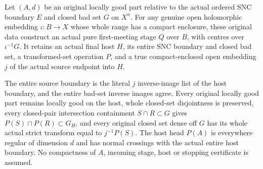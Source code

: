 \begin{theorem}
\label{hir:original-local-pure-head-actual-host-producer}
Let $(A,d)$ be an original locally good part relative to the actual
ordered SNC boundary $E$ and closed bad set $G$ on $X^n$. For any
genuine open holomorphic embedding $\iota:B\to X$ whose whole range
has a compact enclosure, these original data construct an actual pure
first-meeting stage $Q$ over $B$, with centres over $\iota^{-1}G$.
It retains an actual final host $H$, its entire SNC boundary and closed
bad set, a transformed-set operation $P$, and a true compact-enclosed
open embedding $j$ of the actual source endpoint into $H$.

The entire source boundary is the literal $j$ inverse-image list of
the host boundary, and the entire bad-set inverse images agree. Every
original locally good part remains locally good on the host, whole
closed-set disjointness is preserved, every closed-pair intersection
containment $S\cap R\subset G$ gives
$P(S)\cap P(R)\subset G_H$, and every original closed set
dense off $G$ has its whole actual strict transform equal to
$j^{-1}P(S)$. The host head $P(A)$ is everywhere regular of dimension
$d$ and has normal crossings with the actual entire host boundary.
No compactness of $A$, incoming stage, host or stopping certificate is
assumed.
\leanok
\end{theorem}

